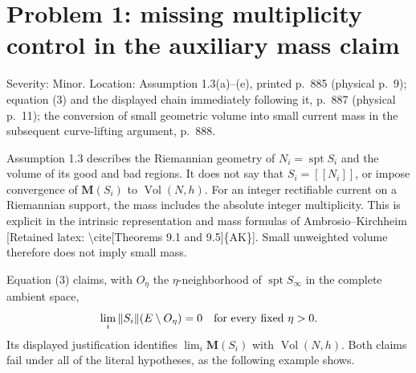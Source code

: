 \documentclass[10pt]{article}
\begin{document}
\section*{Problem 1: missing multiplicity control in the auxiliary mass claim}
Severity: Minor. Location: Assumption 1.3(a)–(e), printed p. 885 (physical p. 9); equation (3) and the displayed chain immediately following it, p. 887 (physical p. 11); the conversion of small geometric volume into small current mass in the subsequent curve-lifting argument, p. 888.\par
Assumption 1.3 describes the Riemannian geometry of \(N_i=\operatorname{spt}S_i\) and the volume of its good and bad regions. It does not say that \(S_i=[\![N_i]\!]\), or impose convergence of \(\mathbf M(S_i)\) to \(\operatorname{Vol}(N,h)\). For an integer rectifiable current on a Riemannian support, the mass includes the absolute integer multiplicity. This is explicit in the intrinsic representation and mass formulas of Ambrosio–Kirchheim [Retained latex: \textbackslash{}cite[Theorems 9.1 and 9.5]\{AK\}]. Small unweighted volume therefore does not imply small mass.\par
Equation (3) claims, with \(O_\eta\) the \(\eta\)-neighborhood of \(\operatorname{spt}S_\infty\) in the complete ambient space, \[\lim_i\|S_i\|(E\setminus O_\eta)=0
 \quad\hbox{for every fixed }\eta>0.\] Its displayed justification identifies \(\lim_i\mathbf M(S_i)\) with \(\operatorname{Vol}(N,h)\). Both claims fail under all of the literal hypotheses, as the following example shows.\par
\end{document}

